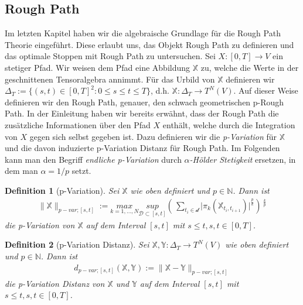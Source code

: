\documentclass[12pt,titlepage,headsepline]{article}
\newtheorem{definition}{Definition}[section]
\begin{document}
      \subsection{Rough Path}
      Im letzten Kapitel haben wir die algebraische Grundlage für die Rough Path Theorie eingeführt. Diese erlaubt uns, das Objekt Rough Path zu definieren und das optimale Stoppen mit Rough Path zu untersuchen.
      \hfill\break
      Sei $X: [0,T] \rightarrow V$ ein stetiger Pfad. Wir weisen dem Pfad eine Abbildung $\mathbb{X}$ zu, welche die Werte in der geschnittenen Tensoralgebra annimmt. Für das Urbild von $\mathbb{X}$ definieren wir $\Delta_T := \{ (s,t) \in [0,T]^2  : 0 \leq s \leq t \leq T\}$, d.h. $\mathbb{X}: \Delta_T \rightarrow T^N(V)$. Auf dieser Weise definieren wir den Rough Path, genauer, den schwach geometrischen p-Rough Path. In der Einleitung haben wir bereits erwähnt, dass der Rough Path die zusätzliche Informationen über den Pfad $X$ enthält, welche durch die Integration von $X$ gegen sich selbst gegeben ist. Dazu definieren wir die \textit{p-Variation} für $\mathbb{X}$ und die davon induzierte p-Variation Distanz für Rough Path. Im Folgenden kann man den Begriff \textit{endliche p-Variation} durch \textit{$\alpha$-Hölder Stetigkeit} ersetzen, in dem man $\alpha=1/p$ setzt.
      \begin{definition}[p-Variation]
        Sei $\mathbb{X}$ wie oben definiert und $p \in \mathbb{N}$. Dann ist
        \begin{align*}
          \lVert \mathbb{X} \rVert_{p-var;[s,t]} := \underset{k=1,\ldots,N}{max} \underset{\mathcal{D} \subset [s,t]}{sup} (\,\sum_{t_i \in \mathcal{d}} \lvert \pi_k(\mathbb{X}_{t_i,t_{i+1}}) \rvert^{\frac{p}{k}})\,^{\frac{k}{p}}
        \end{align*}
        die p-Variation von $\mathbb{X}$ auf dem Interval $[s,t]$ mit $s \leq t, s,t \in [0,T]$.
      \end{definition}
      \begin{definition}[p-Variation Distanz]
        Sei $\mathbb{X}, \mathbb{Y} : \Delta_T \rightarrow T^N(V)$ wie oben definiert und $p \in \mathbb{N}$. Dann ist
        \begin{align*}
          d_{p-var;[s,t]}(\mathbb{X},\mathbb{Y}):=\lVert \mathbb{X} - \mathbb{Y} \rVert_{p-var;[s,t]}
        \end{align*}
        die p-Variation Distanz von $\mathbb{X}$ und $\mathbb{Y}$ auf dem Interval $[s,t]$ mit $s \leq t, s,t \in [0,T]$.
      \end{definition}
\end{document}
